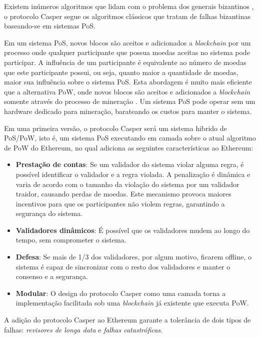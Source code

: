 \documentclass[tcc,capa]{texufpel}
\begin{document}
    Existem inúmeros algoritmos que lidam com o problema dos generais bizantinos \cite{coulouris}, o protocolo Casper segue os algoritmos clássicos que tratam de falhas bizantinas baseando-se em sistemas PoS.
    
    Em um sistema PoS, novos blocos são aceitos e adicionados a \textit{blockchain} por um processo onde qualquer participante que possua moedas aceitas no sistema pode participar. A influência de um participante é equivalente ao número de moedas que este participante possui, ou seja, quanto maior a quantidade de moedas, maior sua influência sobre o sistema PoS. Esta abordagem é muito mais eficiente que a alternativa PoW, onde novos blocos são aceitos e adicionados a \textit{blockchain} somente através do processo de mineração \cite{buterin2017}. Um sistema PoS pode operar sem um hardware dedicado para mineração, barateando os custos para manter o sistema.
    
    Em uma primeira versão, o protocolo Casper será um sistema hibrido de PoS/PoW, isto é, um sistema PoS executando em camada sobre o atual algoritmo de PoW do Ethereum, no qual adiciona as seguintes características ao Ethereum:
    
    \begin{itemize}
        \item \textbf{Prestação de contas}: Se um validador do sistema violar alguma regra, é possível identificar o validador e a regra violada. A penalização é dinâmica e varia de acordo com o tamanho da violação do sistema por um validador traidor, causando perdas de moedas. Este mecanismo provoca maiores incentivos para que os participantes não violem regras, garantindo a segurança do sistema.
        \item \textbf{Validadores dinâmicos}: É possível que os validadores mudem ao longo do tempo, sem comprometer o sistema.
        \item \textbf{Defesa}: Se mais de 1/3 dos validadores, por algum motivo, ficarem offline, o sistema é capaz de sincronizar com o resto dos validadores e manter o consenso e a segurança.
        \item \textbf{Modular}: O design do protocolo Casper como uma camada torna a implementação facilitada sob uma \textit{blockchain} já existente que executa PoW.
    \end{itemize}
    
    A adição do protocolo Casper ao Ethereum garante a tolerância de dois tipos de falhas: \textit{revisores de longa data} e \textit{falhas catastróficas}.
    
\end{document}
